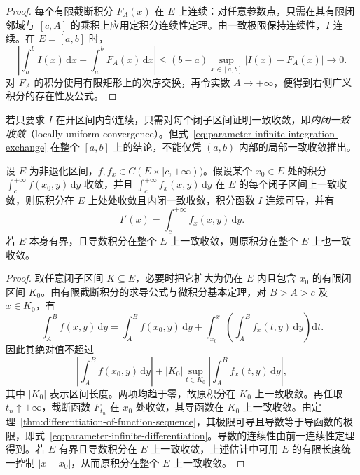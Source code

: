 \documentclass[UTF8,12pt,a4paper,fontset=fandol]{ctexbook}
\begin{document}
\begin{proof}
每个有限截断积分 $F_A(x)$ 在 $E$ 上连续：对任意参数点，只需在其有限闭邻域与 $[c,A]$ 的乘积上应用定积分连续性定理。由一致极限保持连续性，$I$ 连续。在 $E=[a,b]$ 时，
\[
    \left|\int_a^b I(x)\,\mathrm{d}x-\int_a^bF_A(x)\,\mathrm{d}x\right|
    \leq(b-a)\sup_{x\in[a,b]}|I(x)-F_A(x)|\longrightarrow0.
\]
对 $F_A$ 的积分使用有限矩形上的次序交换，再令实数 $A\to+\infty$，便得到右侧广义积分的存在性及公式。
\end{proof}

若只要求 $I$ 在开区间内部连续，只需对每个闭子区间证明一致收敛，即\emph{内闭一致收敛}（locally uniform convergence）。但式~\eqref{eq:parameter-infinite-integration-exchange} 在整个 $[a,b]$ 上的结论，不能仅凭 $(a,b)$ 内部的局部一致收敛推出。

\begin{theorem}[无穷积分的积分号下求导]
\label{thm:parameter-infinite-differentiation}
设 $E$ 为非退化区间，$f,f_x\in C(E\times[c,+\infty))$。假设某个 $x_0\in E$ 处的积分 $\int_c^{+\infty}f(x_0,y)\,\mathrm{d}y$ 收敛，并且 $\int_c^{+\infty}f_x(x,y)\,\mathrm{d}y$ 在 $E$ 的每个闭子区间上一致收敛，则原积分在 $E$ 上处处收敛且内闭一致收敛，积分函数 $I$ 连续可导，并有
\begin{equation}
    I'(x)=\int_c^{+\infty}f_x(x,y)\,\mathrm{d}y.
    \label{eq:parameter-infinite-differentiation}
\end{equation}
若 $E$ 本身有界，且导数积分在整个 $E$ 上一致收敛，则原积分在整个 $E$ 上也一致收敛。
\end{theorem}

\begin{proof}
取任意闭子区间 $K\subseteq E$，必要时把它扩大为仍在 $E$ 内且包含 $x_0$ 的有限闭区间 $K_0$。由有限截断积分的求导公式与微积分基本定理，对 $B>A>c$ 及 $x\in K_0$，有
\[
    \int_A^B f(x,y)\,\mathrm{d}y
    =\int_A^B f(x_0,y)\,\mathrm{d}y
      +\int_{x_0}^x\left(\int_A^B f_x(t,y)\,\mathrm{d}y\right)\mathrm{d}t.
\]
因此其绝对值不超过
\[
    \left|\int_A^B f(x_0,y)\,\mathrm{d}y\right|
    +|K_0|\sup_{t\in K_0}
       \left|\int_A^B f_x(t,y)\,\mathrm{d}y\right|,
\]
其中 $|K_0|$ 表示区间长度。两项均趋于零，故原积分在 $K_0$ 上一致收敛。再任取 $t_n\uparrow+\infty$，截断函数 $F_{t_n}$ 在 $x_0$ 处收敛，其导函数在 $K_0$ 上一致收敛。由定理~\ref{thm:differentiation-of-function-sequence}，其极限可导且导数等于导函数的极限，即式~\eqref{eq:parameter-infinite-differentiation}。导数的连续性由前一连续性定理得到。若 $E$ 有界且导数积分在 $E$ 上一致收敛，上述估计中可用 $E$ 的有限长度统一控制 $|x-x_0|$，从而原积分在整个 $E$ 上一致收敛。
\end{proof}
\end{document}
